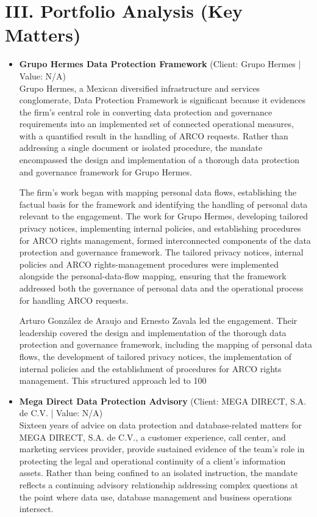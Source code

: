 \documentclass[11pt]{article}
\begin{document}
\section*{III. Portfolio Analysis (Key Matters)}
\begin{itemize}
\item \textbf{Grupo Hermes Data Protection Framework} (Client: Grupo Hermes | Value: N/A)\\ Grupo Hermes, a Mexican diversified infrastructure and services conglomerate, Data Protection Framework is significant because it evidences the firm’s central role in converting data protection and governance requirements into an implemented set of connected operational measures, with a quantified result in the handling of ARCO requests. Rather than addressing a single document or isolated procedure, the mandate encompassed the design and implementation of a thorough data protection and governance framework for Grupo Hermes.

The firm’s work began with mapping personal data flows, establishing the factual basis for the framework and identifying the handling of personal data relevant to the engagement. The work for Grupo Hermes, developing tailored privacy notices, implementing internal policies, and establishing procedures for ARCO rights management, formed interconnected components of the data protection and governance framework. The tailored privacy notices, internal policies and ARCO rights-management procedures were implemented alongside the personal-data-flow mapping, ensuring that the framework addressed both the governance of personal data and the operational process for handling ARCO requests.

Arturo González de Araujo and Ernesto Zavala led the engagement. Their leadership covered the design and implementation of the thorough data protection and governance framework, including the mapping of personal data flows, the development of tailored privacy notices, the implementation of internal policies and the establishment of procedures for ARCO rights management. This structured approach led to 100%
\item \textbf{Mega Direct Data Protection Advisory} (Client: MEGA DIRECT, S.A. de C.V. | Value: N/A)\\ Sixteen years of advice on data protection and database-related matters for MEGA DIRECT, S.A. de C.V., a customer experience, call center, and marketing services provider, provide sustained evidence of the team’s role in protecting the legal and operational continuity of a client’s information assets. Rather than being confined to an isolated instruction, the mandate reflects a continuing advisory relationship addressing complex questions at the point where data use, database management and business operations intersect.


\end{itemize}
\end{document}

